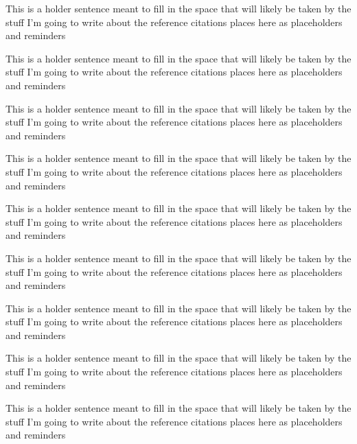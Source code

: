 \cite{hudak1996building}

This is a holder sentence meant to fill in the space that will likely be taken by the stuff I'm going to write about the reference citations places here as placeholders and reminders

\cite{lorenz2011a-code}

This is a holder sentence meant to fill in the space that will likely be taken by the stuff I'm going to write about the reference citations places here as placeholders and reminders

\cite{taha2008domain-specific}

This is a holder sentence meant to fill in the space that will likely be taken by the stuff I'm going to write about the reference citations places here as placeholders and reminders

\cite{deursen2000domain-specific}

This is a holder sentence meant to fill in the space that will likely be taken by the stuff I'm going to write about the reference citations places here as placeholders and reminders

\cite{dmitriev2004a-language}

This is a holder sentence meant to fill in the space that will likely be taken by the stuff I'm going to write about the reference citations places here as placeholders and reminders

\cite{hudak1998modular}

This is a holder sentence meant to fill in the space that will likely be taken by the stuff I'm going to write about the reference citations places here as placeholders and reminders

\cite{spinellis2001notable}

This is a holder sentence meant to fill in the space that will likely be taken by the stuff I'm going to write about the reference citations places here as placeholders and reminders

\cite{mitchell1993on-abstraction}

This is a holder sentence meant to fill in the space that will likely be taken by the stuff I'm going to write about the reference citations places here as placeholders and reminders

\cite{odersky2008programming}

This is a holder sentence meant to fill in the space that will likely be taken by the stuff I'm going to write about the reference citations places here as placeholders and reminders

